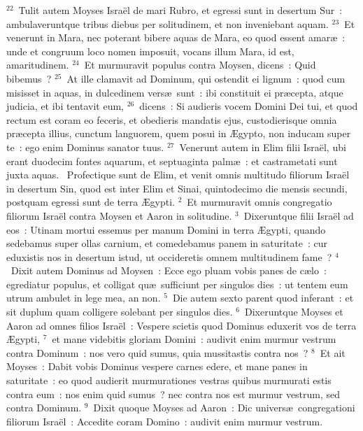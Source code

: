 ${}^{22}$~Tulit autem Moyses Isra\"el de mari Rubro, et egressi sunt in desertum Sur~: ambulaveruntque tribus diebus per solitudinem, et non inveniebant aquam.
${}^{23}$~Et venerunt in Mara, nec poterant bibere aquas de Mara, eo quod essent amar\ae~: unde et congruum loco nomen imposuit, vocans illum Mara, id est, amaritudinem.
${}^{24}$~Et murmuravit populus contra Moysen, dicens~: Quid bibemus~?
${}^{25}$~At ille clamavit ad Dominum, qui ostendit ei lignum~: quod cum misisset in aquas, in dulcedinem vers\ae\ sunt~: ibi constituit ei pr\ae cepta, atque judicia, et ibi tentavit eum,
${}^{26}$~dicens~: Si audieris vocem Domini Dei tui, et quod rectum est coram eo feceris, et obedieris mandatis ejus, custodierisque omnia pr\ae cepta illius, cunctum languorem, quem posui in \AE gypto, non inducam super te~: ego enim Dominus sanator tuus.
${}^{27}$~Venerunt autem in Elim filii Isra\"el, ubi erant duodecim fontes aquarum, et septuaginta palm\ae~: et castrametati sunt juxta aquas.
~\lettrine[lines=10,image=true,loversize=0.05,lraise=-0.03]{P}{}rofectique sunt de Elim, et venit omnis multitudo filiorum Isra\"el in desertum Sin, quod est inter Elim et Sinai, quintodecimo die mensis secundi, postquam egressi sunt de terra \AE gypti.
${}^{2}$~Et murmuravit omnis congregatio filiorum Isra\"el contra Moysen et Aaron in solitudine.
${}^{3}$~Dixeruntque filii Isra\"el ad eos~: Utinam mortui essemus per manum Domini in terra \AE gypti, quando sedebamus super ollas carnium, et comedebamus panem in saturitate~: cur eduxistis nos in desertum istud, ut occideretis omnem multitudinem fame~?
${}^{4}$~Dixit autem Dominus ad Moysen~: Ecce ego pluam vobis panes de c\ae lo~: egrediatur populus, et colligat qu\ae\ sufficiunt per singulos dies~: ut tentem eum utrum ambulet in lege mea, an non.
${}^{5}$~Die autem sexto parent quod inferant~: et sit duplum quam colligere solebant per singulos dies.
${}^{6}$~Dixeruntque Moyses et Aaron ad omnes filios Isra\"el~: Vespere scietis quod Dominus eduxerit vos de terra \AE gypti,
${}^{7}$~et mane videbitis gloriam Domini~: audivit enim murmur vestrum contra Dominum~: nos vero quid sumus, quia mussitastis contra nos~?
${}^{8}$~Et ait Moyses~: Dabit vobis Dominus vespere carnes edere, et mane panes in saturitate~: eo quod audierit murmurationes vestras quibus murmurati estis contra eum~: nos enim quid sumus~? nec contra nos est murmur vestrum, sed contra Dominum.
${}^{9}$~Dixit quoque Moyses ad Aaron~: Dic univers\ae\ congregationi filiorum Isra\"el~: Accedite coram Domino~: audivit enim murmur vestrum.
